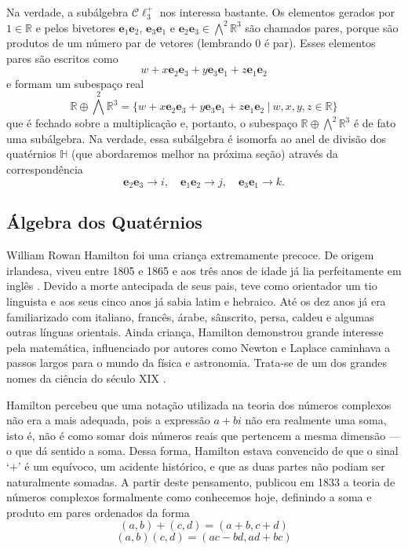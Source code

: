 \documentclass[a4paper,12pt]{report}
\theoremstyle{plain}
\theoremstyle{definition}
\begin{document}
	Na verdade, a subálgebra $\mathcal C \ell_3^+$ nos interessa bastante. Os elementos gerados por $1 \in \mathbb{R}$ e pelos bivetores $\mathbf e_1\mathbf e_2$, $\mathbf e_3\mathbf e_1$ e $\mathbf e_2\mathbf e_3 \in \bigwedge^2\mathbb{R}^3$ são chamados pares, porque são produtos de um número par de vetores (lembrando 0 é par). Esses elementos pares são escritos como $$w+x\mathbf e_2\mathbf e_3 + y \mathbf e_3\mathbf e_1+z\mathbf e_1\mathbf e_2$$ e formam um subespaço real $$\mathbb{R}\oplus\bigwedge^2\mathbb{R}^3 = \{w+x\mathbf e_2\mathbf e_3 + y \mathbf e_3\mathbf e_1+z\mathbf e_1\mathbf e_2 \ | \ w,x,y,z \in \mathbb{R} \}$$
	que é fechado sobre a multiplicação e, portanto, o subespaço $\mathbb{R}\oplus \bigwedge^2\mathbb{R}^3$ é de fato uma subálgebra. Na verdade, essa subálgebra é isomorfa ao anel de divisão dos quatérnios $\mathbb{H}$ (que abordaremos melhor na próxima seção) através da correspondência
	$$ \mathbf e_2\mathbf e_3 \rightarrow i,\quad \mathbf e_1\mathbf e_2 \rightarrow j, \quad \mathbf e_3\mathbf e_1 \rightarrow k.$$
	
	\newpage
	
	\subsection{Álgebra dos Quatérnios}
	William Rowan Hamilton foi uma criança extremamente precoce. De origem irlandesa, viveu entre 1805 e 1865 e aos três anos de idade já lia perfeitamente em inglês \cite{BoyerMathHistory}. Devido a morte antecipada de seus pais, teve como orientador um tio linguista e aos seus cinco anos já sabia latim e hebraico. Até os dez anos já era familiarizado com italiano, francês, árabe, sânscrito, persa, caldeu e algumas outras línguas orientais. Ainda criança, Hamilton demonstrou grande interesse pela matemática, influenciado por autores como Newton e Laplace caminhava a passos largos para o mundo da física e astronomia. Trata-se de um dos grandes nomes da ciência do século XIX \cite{AlgebraAbstrata2BienalSBM}.
	
	Hamilton percebeu que uma notação utilizada na teoria dos números complexos não era a mais adequada, pois a expressão $a + bi$ não era realmente uma soma, isto é, não é como somar dois números reais que pertencem a mesma dimensão --- o que dá sentido a soma. Dessa forma, Hamilton estava convencido de que o sinal ‘$+$’ é um equívoco, um acidente histórico, e que as duas partes não podiam ser naturalmente somadas. A partir deste pensamento, publicou em 1833 a teoria de números complexos formalmente como conhecemos hoje, definindo a soma e produto em pares ordenados da forma
	\begin{equation*}
		(a,b) + (c,d) = (a + b, c + d)
	\end{equation*}
	\begin{equation*}
		(a, b)(c, d) = (ac-bd, ad + bc)
	\end{equation*}
	
\end{document}
